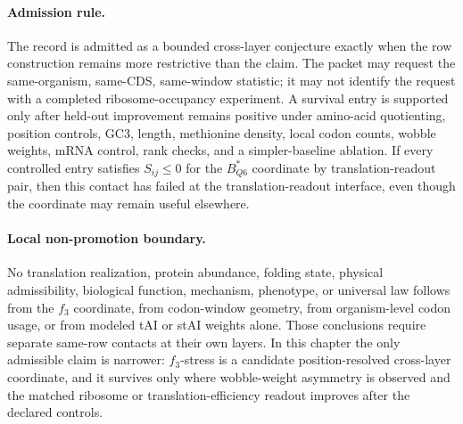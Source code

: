 \paragraph{Admission rule.}
The record is admitted as a bounded cross-layer conjecture exactly when the row construction remains more restrictive than the claim.  The packet may request the same-organism, same-CDS, same-window statistic; it may not identify the request with a completed ribosome-occupancy experiment.  A survival entry is supported only after held-out improvement remains positive under amino-acid quotienting, position controls, GC3, length, methionine density, local codon counts, wobble weights, mRNA control, rank checks, and a simpler-baseline ablation.  If every controlled entry satisfies $S_{ij}\leq 0$ for the $B^{\ast}_{Q6}$ coordinate by translation-readout pair, then this contact has failed at the translation-readout interface, even though the coordinate may remain useful elsewhere.

\paragraph{Local non-promotion boundary.}
No translation realization, protein abundance, folding state, physical admissibility, biological function, mechanism, phenotype, or universal law follows from the $f_3$ coordinate, from codon-window geometry, from organism-level codon usage, or from modeled tAI or stAI weights alone.  Those conclusions require separate same-row contacts at their own layers.  In this chapter the only admissible claim is narrower: $f_3$-stress is a candidate position-resolved cross-layer coordinate, and it survives only where wobble-weight asymmetry is observed and the matched ribosome or translation-efficiency readout improves after the declared controls.
